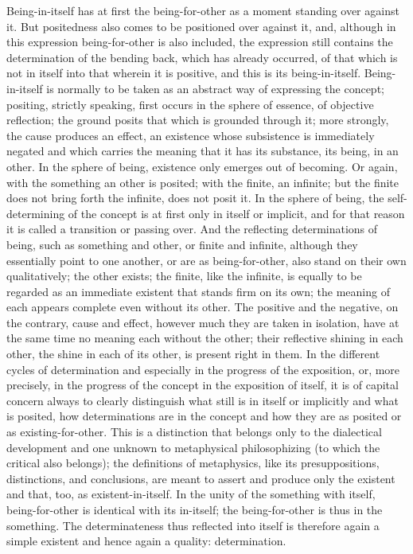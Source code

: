 Being-in-itself has at first the being-for-other
as a moment standing over against it.
But positedness also comes to be positioned over against it,
and, although in this expression being-for-other is also included,
the expression still contains the determination of the bending back,
which has already occurred,
of that which is not in itself into that wherein it is
positive, and this is its being-in-itself.
Being-in-itself is normally to be taken
as an abstract way of expressing the concept;
positing, strictly speaking, first occurs
in the sphere of essence, of objective reflection;
the ground posits that which is grounded through it;
more strongly, the cause produces an effect,
an existence whose subsistence is immediately negated
and which carries the meaning that it has its substance,
its being, in an other.
In the sphere of being, existence only emerges out of becoming.
Or again, with the something an other is posited;
with the finite, an infinite;
but the finite does not bring forth the infinite,
does not posit it.
In the sphere of being, the self-determining of
the concept is at first only in itself or implicit,
and for that reason it is called a transition or passing over.
And the reflecting determinations of being,
such as something and other,
or finite and infinite,
although they essentially point to one another,
or are as being-for-other,
also stand on their own qualitatively; the other exists;
the finite, like the infinite, is equally to be regarded
as an immediate existent that stands firm on its own;
the meaning of each appears complete even without its other.
The positive and the negative, on the contrary, cause and effect,
however much they are taken in isolation,
have at the same time no meaning each without the other;
their reflective shining in each other,
the shine in each of its other,
is present right in them.
In the different cycles of determination
and especially in the progress of the exposition,
or, more precisely, in the progress of the concept
in the exposition of itself,
it is of capital concern always to clearly distinguish
what still is in itself or implicitly
and what is posited,
how determinations are in the concept
and how they are as posited
or as existing-for-other.
This is a distinction that belongs only to
the dialectical development and one unknown
to metaphysical philosophizing
(to which the critical also belongs);
the definitions of metaphysics,
like its presuppositions, distinctions, and conclusions,
are meant to assert and produce only the existent
and that, too, as existent-in-itself.
In the unity of the something with itself,
being-for-other is identical with its in-itself;
the being-for-other is thus in the something.
The determinateness thus reflected into itself is
therefore again a simple existent
and hence again a quality: determination.

